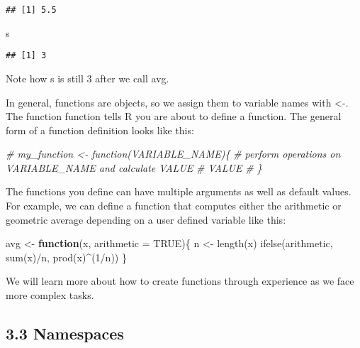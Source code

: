 \documentclass[
]{article}
\newenvironment{Shaded}{\begin{snugshade}}{\end{snugshade}}
\newcommand{\AttributeTok}[1]{\textcolor[rgb]{0.77,0.63,0.00}{#1}}
\newcommand{\CommentTok}[1]{\textcolor[rgb]{0.56,0.35,0.01}{\textit{#1}}}
\newcommand{\ConstantTok}[1]{\textcolor[rgb]{0.00,0.00,0.00}{#1}}
\newcommand{\ControlFlowTok}[1]{\textcolor[rgb]{0.13,0.29,0.53}{\textbf{#1}}}
\newcommand{\DecValTok}[1]{\textcolor[rgb]{0.00,0.00,0.81}{#1}}
\newcommand{\FunctionTok}[1]{\textcolor[rgb]{0.00,0.00,0.00}{#1}}
\newcommand{\NormalTok}[1]{#1}
\newcommand{\OtherTok}[1]{\textcolor[rgb]{0.56,0.35,0.01}{#1}}
\newcommand{\SpecialCharTok}[1]{\textcolor[rgb]{0.00,0.00,0.00}{#1}}
\begin{document}
\begin{verbatim}
## [1] 5.5
\end{verbatim}

\begin{Shaded}
\begin{Highlighting}[]
\NormalTok{s}
\end{Highlighting}
\end{Shaded}

\begin{verbatim}
## [1] 3
\end{verbatim}

Note how s is still 3 after we call avg.

In general, functions are objects, so we assign them to variable names
with \textless-. The function function tells R you are about to define a
function. The general form of a function definition looks like this:

\begin{Shaded}
\begin{Highlighting}[]
\CommentTok{\# my\_function \textless{}{-} function(VARIABLE\_NAME)\{}
\CommentTok{\#  perform operations on VARIABLE\_NAME and calculate VALUE}
\CommentTok{\#  VALUE}
\CommentTok{\# \}}
\end{Highlighting}
\end{Shaded}

The functions you define can have multiple arguments as well as default
values. For example, we can define a function that computes either the
arithmetic or geometric average depending on a user defined variable
like this:

\begin{Shaded}
\begin{Highlighting}[]
\NormalTok{avg }\OtherTok{\textless{}{-}} \ControlFlowTok{function}\NormalTok{(x, }\AttributeTok{arithmetic =} \ConstantTok{TRUE}\NormalTok{)\{}
\NormalTok{  n }\OtherTok{\textless{}{-}} \FunctionTok{length}\NormalTok{(x)}
  \FunctionTok{ifelse}\NormalTok{(arithmetic, }\FunctionTok{sum}\NormalTok{(x)}\SpecialCharTok{/}\NormalTok{n, }\FunctionTok{prod}\NormalTok{(x)}\SpecialCharTok{\^{}}\NormalTok{(}\DecValTok{1}\SpecialCharTok{/}\NormalTok{n))}
\NormalTok{\}}
\end{Highlighting}
\end{Shaded}

We will learn more about how to create functions through experience as
we face more complex tasks.

\hypertarget{namespaces}{%
\subsection{3.3 Namespaces}\label{namespaces}}
\end{document}
